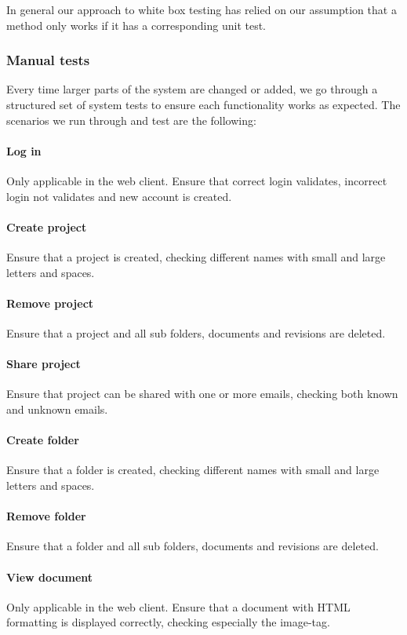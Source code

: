 In general our approach to white box testing has relied on our assumption that a method only works if it has a corresponding unit test.

\subsubsection{Manual tests}
Every time larger parts of the system are changed or added, we go through a structured set of system tests to ensure each functionality works as expected. The scenarios we run through and test are the following:

	\paragraph{Log in}
	Only applicable in the web client. Ensure that correct login validates, incorrect login not validates and new account is created.

	\paragraph{Create project}
	Ensure that a project is created, checking different names with small and large letters and spaces.

	\paragraph{Remove project}
	Ensure that a project and all sub folders, documents and revisions are deleted.

	\paragraph{Share project}
	Ensure that project can be shared with one or more emails, checking both known and unknown emails.

	\paragraph{Create folder}
	Ensure that a folder is created, checking different names with small and large letters and spaces.

	\paragraph{Remove folder}
	Ensure that a folder and all sub folders, documents and revisions are deleted.

	\paragraph{View document}
	Only applicable in the web client. Ensure that a document with HTML formatting is displayed correctly, checking especially the image-tag.

